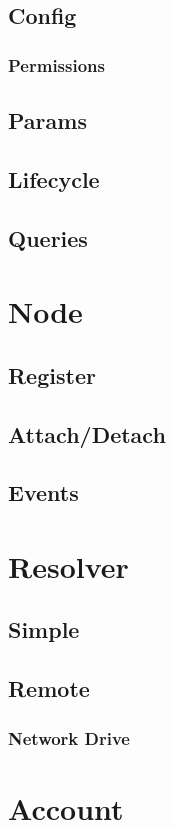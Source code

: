 \documentclass{article}
\begin{document}
\subsection{Config}
\subsubsection{Permissions}
\subsection{Params}
\subsection{Lifecycle}
\subsection{Queries}

\section{Node}
\subsection{Register}
\subsection{Attach/Detach}
\subsection{Events}

\section{Resolver}
\subsection{Simple}
\subsection{Remote}
\subsubsection{Network Drive}

\section{Account}
\end{document}
